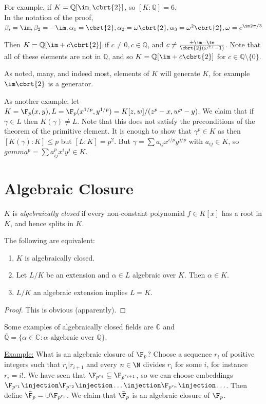 \documentclass[a4paper, 10pt, twocolumn]{amsart}
\begin{document}
For example, if $K = \mathbb{Q}[\im, \cbrt{2}]$, so $[K:\mathbb{Q}] = 6$.\\
In the notation of the proof, $\beta_i = \im, \beta_2 = - \im, \alpha_1 = \cbrt{2}, \alpha_2 = \omega \cbrt{2}, \alpha_3= \omega^2\cbrt{2}, \omega=e^{\im2\pi/3}$

Then $K=\mathbb{Q}[\im+c\cbrt{2}]$ if $c\neq 0, c \in \mathbb{Q}$, and $c \neq \frac{\pm\im-\im}{\cbrt{2}(\omega^{\pm 1}-1)}$. Note that all of these elements are not in $\mathbb{Q}$, and so $K = \mathbb{Q}[\im+c\cbrt{2}]$ for $c\in \mathbb{Q}\setminus\{0\}$.

As noted, many, and indeed most, elements of $K$ will generate $K$, for example $\im\cbrt{2}$ is a generator.

As another example, let $K = \F_p(x,y), L = \F_p(x^{1/p}, y^{1/p}) = K[z,w]/(z^p-x, w^p-y)$. We claim that if $\gamma \in L$ then $K(\gamma) \neq L$. Note that this does not satisfy the preconditions of the theorem of the primitive element. It is enough to show that $\gamma^p \in K$ as then $[K(\gamma):K] \leq p$ but $[L:K] = p^2$. But $\gamma = \sum a_{ij}x^{i/p}y^{j/p}$ with $a_{ij} \in K$, so $gamma^p =\sum a_{ij}^p x^i y^j \in K$.

\section{Algebraic Closure}
$K$ is \emph{algebraically closed} if every non-constant polynomial $f \in K[x]$ has a root in $K$, and hence splits in $K$. 
\begin{lemma}
The following are equivalent:
\begin{enumerate}
\item $K$ is algebraically closed.
\item Let $L/K$ be an extension and $\alpha \in L$ algebraic over $K$. Then $\alpha \in K$.
\item $L/K$ an algebraic extension implies $L=K$.
\end{enumerate}
\end{lemma}
\begin{proof}
This is obvious (apparently).
\end{proof}
Some examples of algebraically closed fields are $\mathbb{C}$ and $\overline{\mathbb{Q}} = \{\alpha \in \mathbb{C} : \alpha \text{ algebraic over } \mathbb{Q}\}$.

\underline{Example:} What is an algebraic closure of $\F_p$? Choose a sequence $r_i$ of positive integers such that $r_i | r_{i+1}$ and every $n \in \N$ divides $r_i$ for some $i$, for instance $r_i = i!$. We have seen that $\F_{p^{r_i}} \subseteq \F_{p^{r_{i+1}}}$, so we can choose embeddings $\F_{p^{r_1}} \injection \F_{p^{r_2}} \injection \ldots \injection \F_{p^{r_n}} \injection \ldots$. Then define $\bar{\F_p}= \cup \F_{p^{r_i}}$. We claim that $\bar{\F_p}$ is an algebraic closure of $\F_p$.
\end{document}
